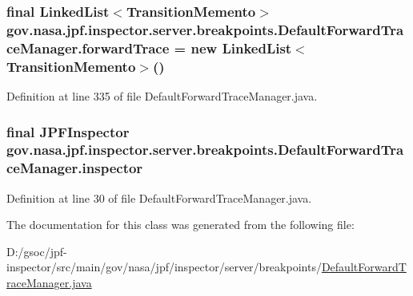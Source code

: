 \subsubsection[{\texorpdfstring{forward\+Trace}{forwardTrace}}]{\setlength{\rightskip}{0pt plus 5cm}final Linked\+List$<${\bf Transition\+Memento}$>$ gov.\+nasa.\+jpf.\+inspector.\+server.\+breakpoints.\+Default\+Forward\+Trace\+Manager.\+forward\+Trace = new Linked\+List$<${\bf Transition\+Memento}$>$()\hspace{0.3cm}{\ttfamily [private]}}\hypertarget{classgov_1_1nasa_1_1jpf_1_1inspector_1_1server_1_1breakpoints_1_1_default_forward_trace_manager_ae2746ab2733a47bce8ee3fe677d6e396}{}\label{classgov_1_1nasa_1_1jpf_1_1inspector_1_1server_1_1breakpoints_1_1_default_forward_trace_manager_ae2746ab2733a47bce8ee3fe677d6e396}


Definition at line 335 of file Default\+Forward\+Trace\+Manager.\+java.

\subsubsection[{\texorpdfstring{inspector}{inspector}}]{\setlength{\rightskip}{0pt plus 5cm}final {\bf J\+P\+F\+Inspector} gov.\+nasa.\+jpf.\+inspector.\+server.\+breakpoints.\+Default\+Forward\+Trace\+Manager.\+inspector\hspace{0.3cm}{\ttfamily [private]}}\hypertarget{classgov_1_1nasa_1_1jpf_1_1inspector_1_1server_1_1breakpoints_1_1_default_forward_trace_manager_a7a495164429696989989854362749bcb}{}\label{classgov_1_1nasa_1_1jpf_1_1inspector_1_1server_1_1breakpoints_1_1_default_forward_trace_manager_a7a495164429696989989854362749bcb}


Definition at line 30 of file Default\+Forward\+Trace\+Manager.\+java.



The documentation for this class was generated from the following file\+:\begin{DoxyCompactItemize}
\item 
D\+:/gsoc/jpf-\/inspector/src/main/gov/nasa/jpf/inspector/server/breakpoints/\hyperlink{_default_forward_trace_manager_8java}{Default\+Forward\+Trace\+Manager.\+java}\end{DoxyCompactItemize}
